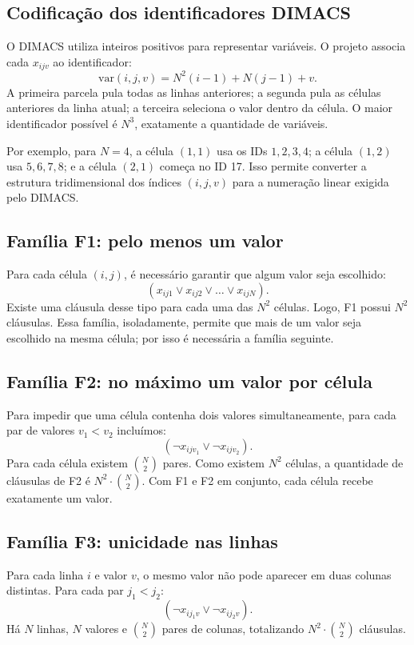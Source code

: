\documentclass[a4paper, 12pt]{article}
\begin{document}
\subsection{Codificação dos identificadores DIMACS}

O DIMACS utiliza inteiros positivos para representar variáveis. O projeto associa cada \(x_{ijv}\) ao identificador:
\[
\text{var}(i,j,v) = N^2(i-1) + N(j-1) + v.
\]
A primeira parcela pula todas as linhas anteriores; a segunda pula as células anteriores da linha atual; a terceira seleciona o valor dentro da célula. O maior identificador possível é \(N^3\), exatamente a quantidade de variáveis.

Por exemplo, para \(N=4\), a célula \((1,1)\) usa os IDs \(1,2,3,4\); a célula \((1,2)\) usa \(5,6,7,8\); e a célula \((2,1)\) começa no ID 17. Isso permite converter a estrutura tridimensional dos índices \((i,j,v)\) para a numeração linear exigida pelo DIMACS.

\subsection{Família F1: pelo menos um valor}

Para cada célula \((i,j)\), é necessário garantir que algum valor seja escolhido:
\[
(x_{ij1} \lor x_{ij2} \lor \dots \lor x_{ijN}).
\]
Existe uma cláusula desse tipo para cada uma das \(N^2\) células. Logo, F1 possui \(N^2\) cláusulas. Essa família, isoladamente, permite que mais de um valor seja escolhido na mesma célula; por isso é necessária a família seguinte.

\subsection{Família F2: no máximo um valor por célula}

Para impedir que uma célula contenha dois valores simultaneamente, para cada par de valores \(v_1 < v_2\) incluímos:
\[
(\neg x_{ijv_1} \lor \neg x_{ijv_2}).
\]
Para cada célula existem \(\binom{N}{2}\) pares. Como existem \(N^2\) células, a quantidade de cláusulas de F2 é \(N^2 \cdot \binom{N}{2}\). Com F1 e F2 em conjunto, cada célula recebe exatamente um valor.

\subsection{Família F3: unicidade nas linhas}

Para cada linha \(i\) e valor \(v\), o mesmo valor não pode aparecer em duas colunas distintas. Para cada par \(j_1 < j_2\):
\[
(\neg x_{ij_1v} \lor \neg x_{ij_2v}).
\]
Há \(N\) linhas, \(N\) valores e \(\binom{N}{2}\) pares de colunas, totalizando \(N^2 \cdot \binom{N}{2}\) cláusulas.
\end{document}
